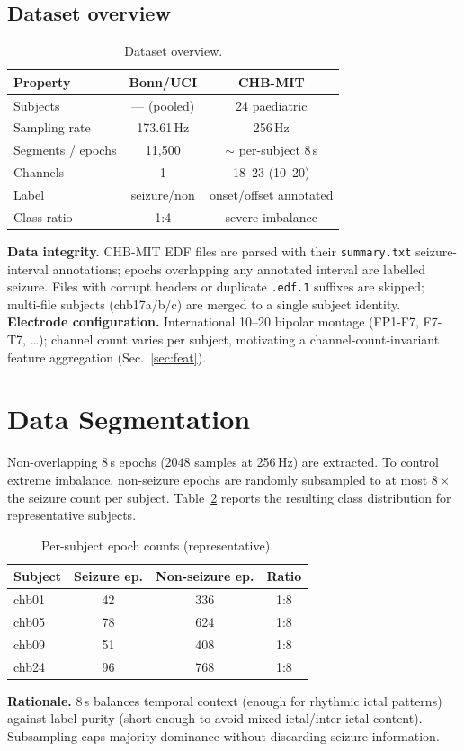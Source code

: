 \documentclass[10pt,journal,twocolumn]{IEEEtran}
\begin{document}
\subsection{Dataset overview}
\begin{table}[h]\centering\caption{Dataset overview.}\label{tab:dsov}
\begin{tabular}{lcc}\toprule
Property & Bonn/UCI & CHB-MIT\\\midrule
Subjects & --- (pooled) & 24 paediatric\\
Sampling rate & 173.61\,Hz & 256\,Hz\\
Segments / epochs & 11{,}500 & $\sim$ per-subject 8\,s\\
Channels & 1 & 18--23 (10--20)\\
Label & seizure/non & onset/offset annotated\\
Class ratio & 1:4 & severe imbalance\\\bottomrule
\end{tabular}\end{table}
\textbf{Data integrity.} CHB-MIT EDF files are parsed with their \texttt{summary.txt} seizure-interval annotations; epochs overlapping any annotated interval are labelled seizure. Files with corrupt headers or duplicate \texttt{.edf.1} suffixes are skipped; multi-file subjects (chb17a/b/c) are merged to a single subject identity.
\textbf{Electrode configuration.} International 10--20 bipolar montage (FP1-F7, F7-T7, \ldots); channel count varies per subject, motivating a channel-count-invariant feature aggregation (Sec.~\ref{sec:feat}).

\section{Data Segmentation}
Non-overlapping 8\,s epochs ($2048$ samples at 256\,Hz) are extracted. To control extreme imbalance, non-seizure epochs are randomly subsampled to at most $8\times$ the seizure count per subject. Table~\ref{tab:seg} reports the resulting class distribution for representative subjects.
\begin{table}[h]\centering\caption{Per-subject epoch counts (representative).}\label{tab:seg}
\begin{tabular}{lccc}\toprule
Subject & Seizure ep. & Non-seizure ep. & Ratio\\\midrule
chb01 & 42 & 336 & 1:8\\
chb05 & 78 & 624 & 1:8\\
chb09 & 51 & 408 & 1:8\\
chb24 & 96 & 768 & 1:8\\\bottomrule
\end{tabular}\end{table}
\textbf{Rationale.} 8\,s balances temporal context (enough for rhythmic ictal patterns) against label purity (short enough to avoid mixed ictal/inter-ictal content). Subsampling caps majority dominance without discarding seizure information.
\end{document}
